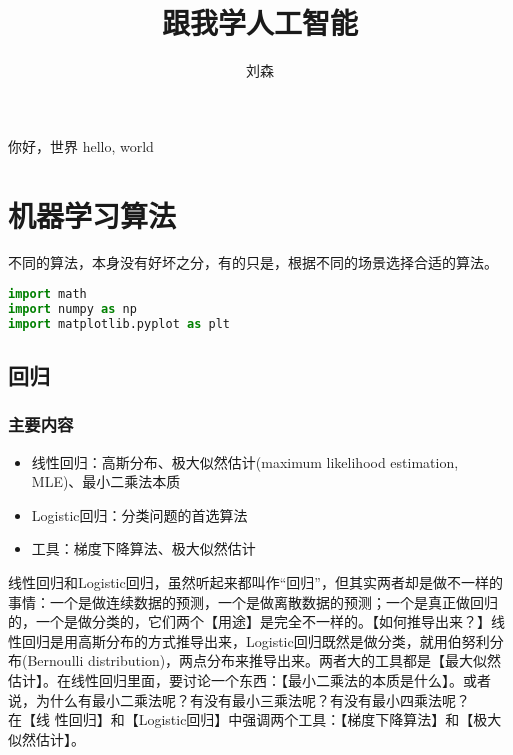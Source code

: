 \documentclass[UTF8]{ctexbook}
\author{刘森}
\title{跟我学人工智能}
\begin{document}
    \maketitle
你好，世界 hello, world %
\tableofcontents
\mainmatter
\part{机器学习算法}

不同的算法，本身没有好坏之分，有的只是，根据不同的场景选择合适的算法。

\begin{lstlisting}[language=python]
import math
import numpy as np
import matplotlib.pyplot as plt


\end{lstlisting}


\section{}



\newpage
\chapter{回归}

\section{主要内容}

\begin{itemize}
\item 线性回归：高斯分布、极大似然估计(maximum likelihood estimation, MLE)、最小二乘法本质
\item Logistic回归：分类问题的首选算法
\item 工具：梯度下降算法、极大似然估计
\end{itemize}


线性回归和Logistic回归，虽然听起来都叫作“回归”，但其实两者却是做不一样的事情：一个是做连续数据的预测，一个是做离散数据的预测；一个是真正做回归的，一个是做分类的，它们两个【用途】是完全不一样的。【如何推导出来？】线性回归是用高斯分布的方式推导出来，Logistic回归既然是做分类，就用伯努利分布(Bernoulli distribution)，两点分布来推导出来。两者大的工具都是【最大似然估计】。在线性回归里面，要讨论一个东西：【最小二乘法的本质是什么】。或者说，为什么有最小二乘法呢？有没有最小三乘法呢？有没有最小四乘法呢？\\

在【线 性回归】和【Logistic回归】中强调两个工具：【梯度下降算法】和【极大似然估计】。
\end{document}
